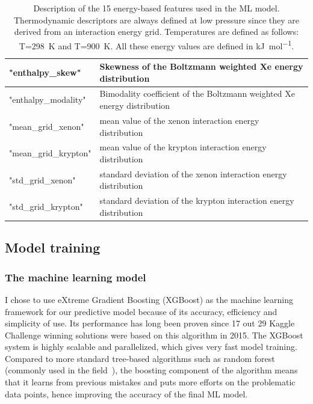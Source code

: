 \documentclass[main]{subfiles}
\begin{document}
\begin{table}[ht]
\begin{tabular}{|l|m{10cm}|}
  \hline
  "enthalpy\_skew"  & Skewness of the Boltzmann weighted Xe energy distribution \\
  \hline
  "enthalpy\_modality"  & Bimodality coefficient of the Boltzmann weighted Xe energy distribution \\
  \hline
  "mean\_grid\_xenon"  & mean value of the xenon interaction energy distribution \\
  \hline
  "mean\_grid\_krypton"  & mean value of the krypton interaction energy distribution \\
  \hline
  "std\_grid\_xenon"  & standard deviation of the xenon interaction energy distribution \\
  \hline
  "std\_grid\_krypton"  & standard deviation of the krypton interaction energy distribution \\
  \hline
  \end{tabular}
  \caption{Description of the 15 energy-based features used in the ML model. Thermodynamic descriptors are always defined at low pressure since they are derived from an interaction energy grid. Temperatures are defined as follows: T=298~\si{\kelvin} and T=900~\si{\kelvin}. All these energy values are defined in \si{\kilo\joule\per\mole}.}\label{tab:energy_descriptors}
  \end{table}
  
  \clearpage

\subsection{Model training}

\subsubsection{The machine learning model}

I chose to use eXtreme Gradient Boosting (XGBoost) as the machine learning framework for our predictive model because of its accuracy, efficiency and simplicity of use. Its performance has long been proven since 17 out 29 Kaggle Challenge winning solutions were based on this algorithm in 2015. The XGBoost system is highly scalable and parallelized, which gives very fast model training.\autocite{chen2016xgboost} Compared to more standard tree-based algorithms such as random forest (commonly used in the field~\autocite{Simon_2015}), the boosting component of the algorithm means that it learns from previous mistakes and puts more efforts on the problematic data points, hence improving the accuracy of the final ML model.
\end{document}
